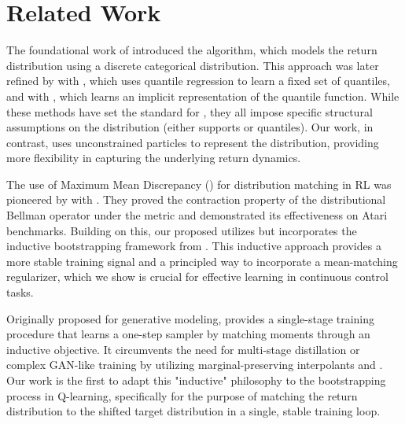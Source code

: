 \section{Related Work}

 The foundational work of \citet{bellemare2017distributional} introduced the \cfiftyone algorithm, which models the return distribution using a discrete categorical distribution. This approach was later refined by \citet{dabney2018distributional} with \qrdqn, which uses quantile regression to learn a fixed set of quantiles, and \citet{dabney2018implicit} with \iqn, which learns an implicit representation of the quantile function. While these methods have set the standard for \distrl, they all impose specific structural assumptions on the distribution (either supports or quantiles). Our work, in contrast, uses unconstrained particles to represent the distribution, providing more flexibility in capturing the underlying return dynamics.

 The use of Maximum Mean Discrepancy (\mmd) for distribution matching in RL was pioneered by \citet{nguyen2020distributional} with \mmddqn. They proved the contraction property of the distributional Bellman operator under the \mmd metric and demonstrated its effectiveness on Atari benchmarks. Building on this, our proposed \immq utilizes \mmd but incorporates the inductive bootstrapping framework from \imm \cite{zhou2025inductive}. This inductive approach provides a more stable training signal and a principled way to incorporate a mean-matching regularizer, which we show is crucial for effective learning in continuous control tasks.

 Originally proposed for generative modeling, \imm \cite{zhou2025inductive} provides a single-stage training procedure that learns a one-step sampler by matching moments through an inductive objective. It circumvents the need for multi-stage distillation or complex GAN-like training by utilizing marginal-preserving interpolants and \mmd. Our work is the first to adapt this "inductive" philosophy to the bootstrapping process in Q-learning, specifically for the purpose of matching the return distribution to the shifted target distribution in a single, stable training loop.
